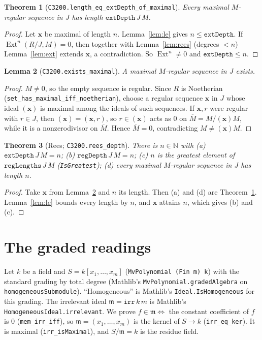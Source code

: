 \documentclass[11pt]{article}
\newtheorem{theorem}{Theorem}
\newtheorem{lemma}[theorem]{Lemma}
\theoremstyle{definition}
\newcommand{\Ext}{\operatorname{Ext}}
\begin{document}
\begin{theorem}[\texttt{C3200.length\_eq\_extDepth\_of\_maximal}]\label{thm:max}
Every maximal $M$-regular sequence in $J$ has length $\texttt{extDepth}\,J\,M$.
\end{theorem}
\begin{proof}
Let $\mathbf x$ be maximal of length $n$. Lemma~\ref{lem:le} gives $n\le\texttt{extDepth}$. If
$\Ext^n(R/J,M)=0$, then together with Lemma~\ref{lem:rees} (degrees $<n$) Lemma~\ref{lem:ext}
extends $\mathbf x$, a contradiction. So $\Ext^n\neq0$ and $\texttt{extDepth}\le n$.
\end{proof}

\begin{lemma}[\texttt{C3200.exists\_maximal}]\label{lem:exists}
A maximal $M$-regular sequence in $J$ exists.
\end{lemma}
\begin{proof}
$M\neq0$, so the empty sequence is regular. Since $R$ is Noetherian
(\texttt{set\_has\_maximal\_iff\_noetherian}), choose a regular sequence $\mathbf x$ in $J$ whose ideal
$(\mathbf x)$ is maximal among the ideals of such sequences. If $\mathbf x,r$ were regular with
$r\in J$, then $(\mathbf x)=(\mathbf x,r)$, so $r\in(\mathbf x)$ acts as $0$ on
$\overline M=M/(\mathbf x)M$, while it is a nonzerodivisor on $\overline M$. Hence $\overline M=0$,
contradicting $M\neq(\mathbf x)M$.
\end{proof}

\begin{theorem}[Rees; \texttt{C3200.rees\_depth}]\label{thm:main}
There is $n\in\mathbb N$ with
(a) $\texttt{extDepth}\,J\,M=n$;
(b) $\texttt{regDepth}\,J\,M=n$;
(c) $n$ is the greatest element of $\texttt{regLengths}\,J\,M$ (\texttt{IsGreatest});
(d) every maximal $M$-regular sequence in $J$ has length $n$.
\end{theorem}
\begin{proof}
Take $\mathbf x$ from Lemma~\ref{lem:exists} and $n$ its length. Then (a) and (d) are
Theorem~\ref{thm:max}. Lemma~\ref{lem:le} bounds every length by $n$, and $\mathbf x$ attains $n$,
which gives (b) and (c).
\end{proof}

\section{The graded readings}

Let $k$ be a field and $S=k[x_1,\dots,x_m]$ (\texttt{MvPolynomial (Fin m) k}) with the standard
grading by total degree (Mathlib's \texttt{MvPolynomial.gradedAlgebra} on
\texttt{homogeneousSubmodule}). ``Homogeneous'' is Mathlib's \texttt{Ideal.IsHomogeneous} for this
grading. The irrelevant ideal $\mathfrak m=\texttt{irr}\,k\,m$ is Mathlib's
\texttt{HomogeneousIdeal.irrelevant}. We prove $f\in\mathfrak m\iff$ the constant coefficient of $f$
is $0$ (\texttt{mem\_irr\_iff}), so $\mathfrak m=(x_1,\dots,x_m)$ is the kernel of $S\to k$
(\texttt{irr\_eq\_ker}). It is maximal (\texttt{irr\_isMaximal}), and $S/\mathfrak m=k$ is the
residue field.
\end{document}

